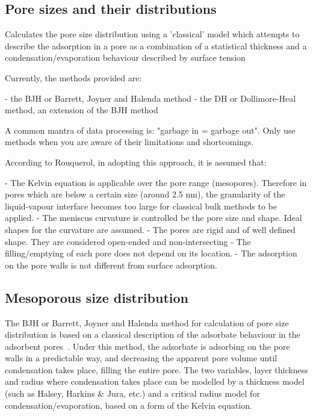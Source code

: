 \subsection{Pore sizes and their distributions}

Calculates the pore size distribution using a 'classical' model which attempts to
describe the adsorption in a pore as a combination of a statistical thickness and
a condensation/evaporation behaviour described by surface tension

Currently, the methods provided are:

    - the BJH or Barrett, Joyner and Halenda method
    - the DH or Dollimore-Heal method, an extension of the BJH method

A common mantra of data processing is: "garbage in = garbage out". Only use methods
when you are aware of their limitations and shortcomings.

According to Rouquerol, in adopting this approach, it is assumed that:

    - The Kelvin equation is applicable over the pore range (mesopores). Therefore
    in pores which are below a certain size (around 2.5 nm), the granularity
    of the liquid-vapour interface becomes too large for classical bulk methods
    to be applied.
    - The meniscus curvature is controlled be the pore size and shape. Ideal shapes
    for the curvature are assumed.
    - The pores are rigid and of well defined shape. They are considered
    open-ended and non-intersecting
    - The filling/emptying of each pore does not depend on its location.
    - The adsorption on the pore walls is not different from surface adsorption.

\subsection{Mesoporous size distribution}


The BJH or Barrett, Joyner and Halenda method for calculation of pore size distribution
is based on a classical description of the adsorbate behaviour in the adsorbent
pores~\cite{barrettDeterminationPoreVolume1951}.
Under this method, the adsorbate is adsorbing on the pore walls in a predictable way,
and decreasing the apparent pore volume until condensation takes place, filling the
entire pore. The two variables, layer thickness and radius where 
condensation takes place can be modelled by a thickness model
(such as Halsey, Harkins \& Jura, etc.) and a
critical radius model for condensation/evaporation, based on a form of the Kelvin equation.

